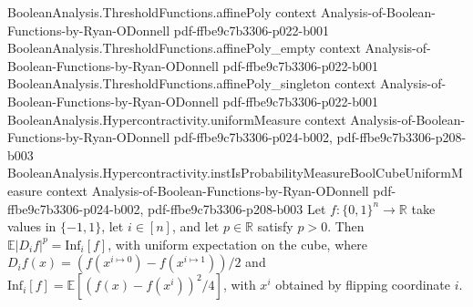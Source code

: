 \begin{lemma}
\proofstep
  {BooleanAnalysis.ThresholdFunctions.affinePoly}
  {context}
  {Analysis-of-Boolean-Functions-by-Ryan-ODonnell}
  {pdf-ffbe9c7b3306-p022-b001}
\proofstep
  {BooleanAnalysis.ThresholdFunctions.affinePoly_empty}
  {context}
  {Analysis-of-Boolean-Functions-by-Ryan-ODonnell}
  {pdf-ffbe9c7b3306-p022-b001}
\proofstep
  {BooleanAnalysis.ThresholdFunctions.affinePoly_singleton}
  {context}
  {Analysis-of-Boolean-Functions-by-Ryan-ODonnell}
  {pdf-ffbe9c7b3306-p022-b001}
\proofstep
  {BooleanAnalysis.Hypercontractivity.uniformMeasure}
  {context}
  {Analysis-of-Boolean-Functions-by-Ryan-ODonnell}
  {pdf-ffbe9c7b3306-p024-b002,
    pdf-ffbe9c7b3306-p208-b003}
\proofstep
  {BooleanAnalysis.Hypercontractivity.instIsProbabilityMeasureBoolCubeUniformMeasure}
  {context}
  {Analysis-of-Boolean-Functions-by-Ryan-ODonnell}
  {pdf-ffbe9c7b3306-p024-b002,
    pdf-ffbe9c7b3306-p208-b003}
Let $f:\{0,1\}^n\to\mathbb R$ take values in $\{-1,1\}$, let $i\in[n]$, and let
$p\in\mathbb R$ satisfy $p>0$. Then $\mathbb E|D_i f|^p=\mathrm{Inf}_i[f]$, with uniform
expectation on the cube, where $D_i f(x)=(f(x^{i\mapsto 0})-f(x^{i\mapsto 1}))/2$ and
$\mathrm{Inf}_i[f]=\mathbb E[(f(x)-f(x^i))^2/4]$, with $x^i$ obtained by flipping
coordinate $i$.
\end{lemma}

